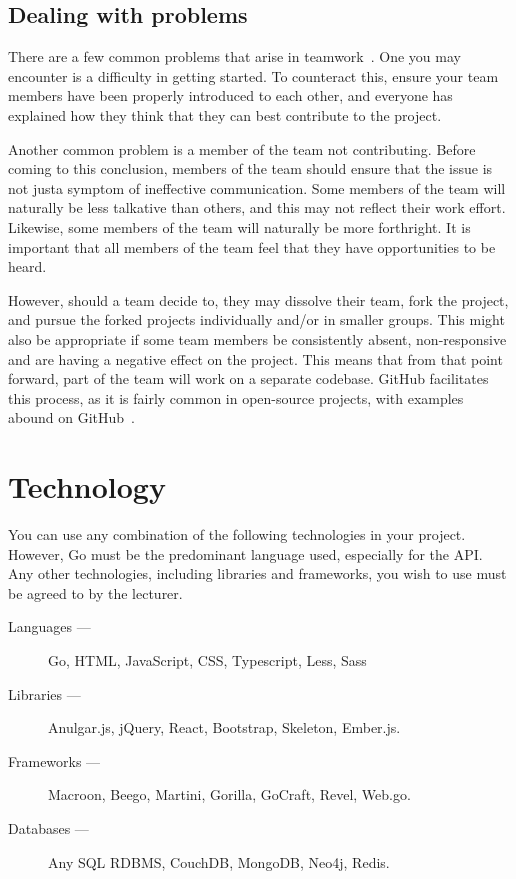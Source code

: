 \subsection*{Dealing with problems}
There are a few common problems that arise in teamwork~\cite{teamworkproblems}.
One you may encounter is a difficulty in getting started.
To counteract this, ensure your team members have been properly introduced to each other, and everyone has explained how they think that they can best contribute to the project.

Another common problem is a member of the team not contributing.
Before coming to this conclusion, members of the team should ensure that the issue is not justa symptom of ineffective communication.
Some members of the team will naturally be less talkative than others, and this may not reflect their work effort.
Likewise, some members of the team will naturally be more forthright.
It is important that all members of the team feel that they have opportunities to be heard.

However, should a team decide to, they may dissolve their team, fork the project, and pursue the forked projects individually and/or in smaller groups.
This might also be appropriate if some team members be consistently absent, non-responsive and are having a negative effect on the project.
This means that from that point forward, part of the team will work on a separate codebase.
GitHub facilitates this process, as it is fairly common in open-source projects, with examples abound on GitHub~\cite{githubforking}.

\section*{Technology}
You can use any combination of the following technologies in your project.
However, Go must be the predominant language used, especially for the API.
Any other technologies, including libraries and frameworks, you wish to use must be agreed to by the lecturer.

\begin{description}
\item[Languages ---] Go, HTML, JavaScript, CSS, Typescript, Less, Sass
\item[Libraries ---] Anulgar.js, jQuery, React, Bootstrap, Skeleton, Ember.js.
\item[Frameworks ---] Macroon, Beego, Martini, Gorilla, GoCraft, Revel, Web.go.
\item[Databases ---] Any SQL RDBMS, CouchDB, MongoDB, Neo4j, Redis.
\end{description}

